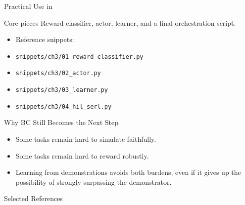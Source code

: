 \documentclass{beamer}
\begin{document}
\begin{frame}{Practical Use in \lerobot}
  \begin{block}{Core pieces}
    Reward classifier, actor, learner, and a final orchestration script.
  \end{block}

  \begin{itemize}
    \item Reference snippets:
    \item \texttt{snippets/ch3/01\_reward\_classifier.py}
    \item \texttt{snippets/ch3/02\_actor.py}
    \item \texttt{snippets/ch3/03\_learner.py}
    \item \texttt{snippets/ch3/04\_hil\_serl.py}
  \end{itemize}
\end{frame}

\begin{frame}{Why BC Still Becomes the Next Step}
  \begin{itemize}
    \item Some tasks remain hard to simulate faithfully.
    \item Some tasks remain hard to reward robustly.
    \item Learning from demonstrations avoids both burdens, even if it gives up the possibility of strongly surpassing the demonstrator.
  \end{itemize}

  \vspace{0.25cm}
\end{frame}

\begin{frame}[allowframebreaks]{Selected References}
\scriptsize
\nocite{ballEfficientOnlineReinforcement2023}

\end{frame}
\end{document}
